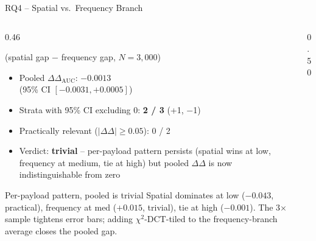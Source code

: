 \documentclass[aspectratio=169,11pt]{beamer}
\begin{document}
\begin{frame}{RQ4 -- Spatial vs.\ Frequency Branch}
\scriptsize
\begin{columns}[T]
\begin{column}{0.46\textwidth}
\begin{block}{(spatial gap $-$ frequency gap, $N\!=\!3{,}000$)}
\begin{itemize}\setlength{\itemsep}{1pt}
\item Pooled $\Delta\Delta_\text{AUC}$: $\boldsymbol{-0.0013}$ \\[1pt] (95\% CI $[-0.0031, +0.0005]$)
\item Strata with 95\% CI excluding 0: \textbf{2 / 3} (+1, $-$1)
\item Practically relevant ($|\Delta\Delta|\!\geq\!0.05$): 0 / 2
\item Verdict: \textbf{trivial} -- per-payload pattern persists (spatial wins at low, frequency at medium, tie at high) but pooled $\Delta\Delta$ is now indistinguishable from zero
\end{itemize}
\end{block}
\begin{exampleblock}{Per-payload pattern, pooled is trivial}
Spatial dominates at low ($-0.043$, practical), frequency at med ($+0.015$, trivial), tie at high ($-0.001$). The 3$\times$ sample tightens error bars; adding $\chi^2$-DCT-tiled to the frequency-branch average closes the pooled gap.
\end{exampleblock}
\end{column}
\begin{column}{0.50\textwidth}
\begin{center}
\end{center}
\end{column}
\end{columns}
\end{frame}
\end{document}
